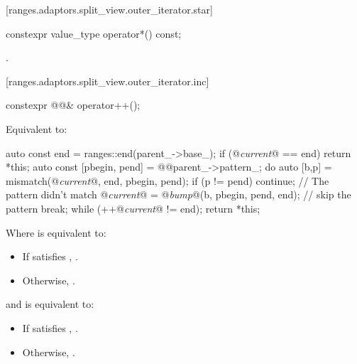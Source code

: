 [ranges.adaptors.split_view.outer_iterator.star]{}

%
\begin{itemdecl}
constexpr value_type operator*() const;
\end{itemdecl}

\begin{itemdescr}
\pnum
\returns {}.
\end{itemdescr}

[ranges.adaptors.split_view.outer_iterator.inc]{}

%
\begin{itemdecl}
constexpr @@& operator++();
\end{itemdecl}

\begin{itemdescr}
\pnum
\effects Equivalent to:
\begin{codeblock}
auto const end = ranges::end(parent_->base_);
if (@\textit{current}@ == end) return *this;
auto const [pbegin, pend] = @@{parent_->pattern_};
do {
  auto [b,p] = mismatch(@\textit{current}@, end, pbegin, pend);
  if (p != pend) continue; // The pattern didn't match
  @\textit{current}@ = @\textit{bump}@(b, pbegin, pend, end); // skip the pattern
  break;
} while (++@\textit{current}@ != end);
return *this;
\end{codeblock}
\end{itemdescr}

Where  is equivalent to:
\begin{itemize}
\item If  satisfies , .
\item Otherwise, .
\end{itemize}

and  is equivalent to:
\begin{itemize}
\item If  satisfies , .
\item Otherwise, .
\end{itemize}


